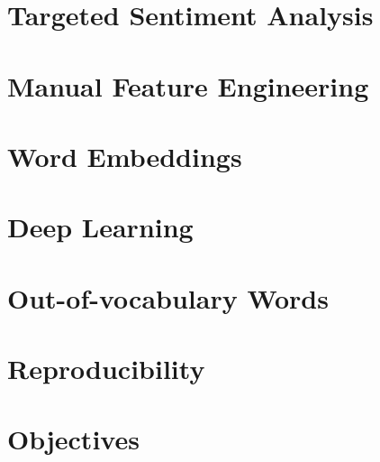 \documentclass[../../fyp.tex]{subfiles}
\begin{document}
\section{Targeted Sentiment Analysis}


\section{Manual Feature Engineering}


\section{Word Embeddings}


\section{Deep Learning}


\section{Out-of-vocabulary Words}


\section{Reproducibility}


\section{Objectives}

\end{document}
